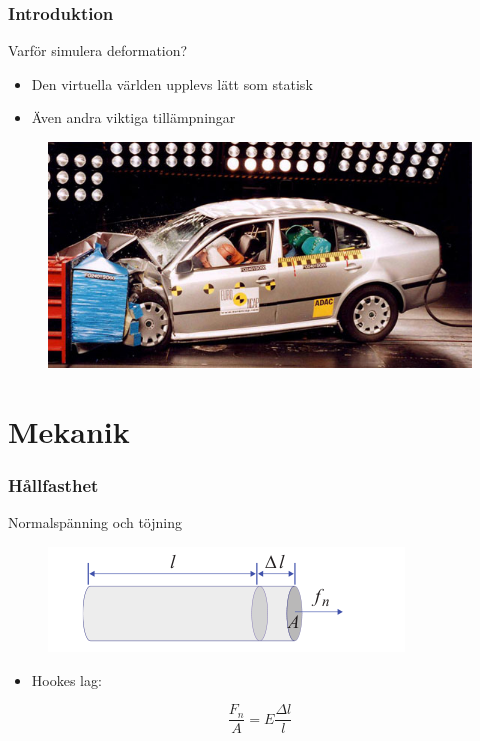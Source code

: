 \documentclass{beamer}
\begin{document}
\begin{frame}
\frametitle{Introduktion}
\begin{block}{Varför simulera deformation?}
\begin{itemize}
\item Den virtuella världen upplevs lätt som statisk
\item Även andra viktiga tillämpningar
\end{itemize}
\begin{figure}
\includegraphics[scale=0.3]{Skoda_Krocktest_27207.png}
\end{figure}
\end{block}
\end{frame}

\section{Mekanik}
\begin{frame}
\frametitle{Hållfasthet}
\begin{block}{Normalspänning och töjning}
\begin{figure}
\includegraphics[scale=0.5]{a88-muller.png}
\end{figure}
\begin{itemize}
\item Hookes lag:
\end{itemize}
\begin{equation}
\frac{F_n}{A} = E \frac{\Delta l}{l}
\end{equation}
\end{block}
\end{frame}
\end{document}
